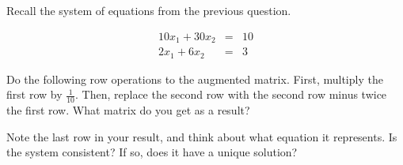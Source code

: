 \endedxproblem





\endedxvertical











Recall the system of equations from the previous question.  



\begin{eqnarray*}
10x_1 + 30x_2 & = & 10 \\
2x_1 + 6x_2 & = & 3 
\end{eqnarray*}





Do the following row operations to the augmented matrix.  First, multiply the first row by 
$\frac{1}{10}$.   Then, replace the second row with the second
row minus twice the first row.  What matrix do you get as a result?  




\edXsolution{\[ \left[ \begin{array}{cc:c}
10 & 30 &10 \\
0 & 0 &1 \\\end{array} \right]\] 


}

\endedxproblem




Note the last row in your result, and think about what equation it represents.  
Is the system consistent?  If so, does it have a unique solution?  



\endedxproblem

